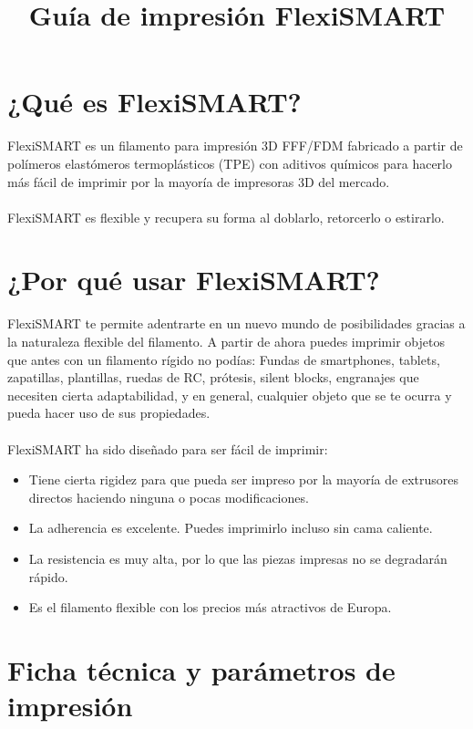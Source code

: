 \documentclass[11pt,a4paper]{article}
\title{Guía de impresión FlexiSMART}
\date{}
\begin{document}
\tableofcontents

\section{¿Qué es FlexiSMART?}FlexiSMART es un filamento para impresión 3D FFF/FDM fabricado a partir de polímeros elastómeros termoplásticos (TPE) con aditivos químicos para hacerlo más fácil de imprimir por la mayoría de impresoras 3D del mercado.
\\\\
FlexiSMART es flexible y recupera su forma al doblarlo, retorcerlo o estirarlo.

\section{¿Por qué usar FlexiSMART?}
FlexiSMART te permite adentrarte en un nuevo mundo de posibilidades gracias a la naturaleza flexible del filamento. A partir de ahora puedes imprimir objetos que antes con un filamento rígido no podías: Fundas de smartphones, tablets, zapatillas, plantillas, ruedas de RC, prótesis, silent blocks, engranajes que necesiten cierta adaptabilidad, y en general, cualquier objeto que se te ocurra y pueda hacer uso de sus propiedades.
\\\\
FlexiSMART ha sido diseñado para ser fácil de imprimir:
\begin{itemize}
\item Tiene cierta rigidez para que pueda ser impreso por la mayoría de extrusores directos haciendo ninguna o pocas modificaciones.
\item La adherencia es excelente. Puedes imprimirlo incluso sin cama caliente.
\item La resistencia es muy alta, por lo que las piezas impresas no se degradarán rápido.
\item Es el filamento flexible con los precios más atractivos de Europa.
\end{itemize}

\section{Ficha técnica y parámetros de impresión}
\end{document}
